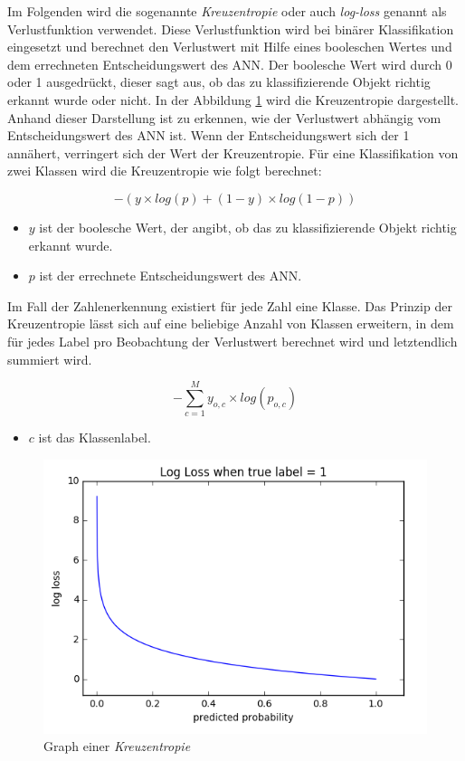 Im Folgenden wird die sogenannte \textit{Kreuzentropie} oder auch \textit{log-loss} genannt als Verlustfunktion verwendet. Diese Verlustfunktion wird bei binärer Klassifikation eingesetzt und berechnet den Verlustwert mit Hilfe eines booleschen Wertes und dem errechneten Entscheidungswert des ANN. Der boolesche Wert wird durch 0 oder 1 ausgedrückt, dieser sagt aus, ob das zu klassifizierende Objekt richtig erkannt wurde oder nicht. In der Abbildung \ref*{fig:crossentropy} wird die Kreuzentropie dargestellt. Anhand dieser Darstellung ist zu erkennen, wie der Verlustwert abhängig vom Entscheidungswert des ANN ist. Wenn der Entscheidungswert sich der 1 annähert, verringert sich der Wert der Kreuzentropie.
Für eine Klassifikation von zwei Klassen wird die Kreuzentropie wie folgt berechnet:

\[-(y\times log(p) + (1 - y) \times log(1-p))\]

\begin{itemize}
    \item $y$ ist der boolesche Wert, der angibt, ob das zu klassifizierende Objekt richtig erkannt wurde.
    \item $p$ ist der errechnete Entscheidungswert des ANN.
\end{itemize}

Im Fall der Zahlenerkennung existiert für jede Zahl eine Klasse. Das Prinzip der Kreuzentropie lässt sich auf eine beliebige Anzahl von Klassen erweitern, in dem für jedes Label pro Beobachtung der Verlustwert berechnet wird und letztendlich summiert wird.

\[ -\sum_{c=1}^{M}y_{o,c} \times log(p_{o,c}) \]

\begin{itemize}
    \item $c$ ist das Klassenlabel.
\end{itemize}
\cite{10.2307/2348828}

\begin{figure}[H]
    \centering
    \includegraphics[width=\imgMed]{images/theory/cross_entropy.png}
    \caption{Graph einer \textit{Kreuzentropie} \cite{fortuna_viana_2019}}
    \label{fig:crossentropy}
\end{figure}

